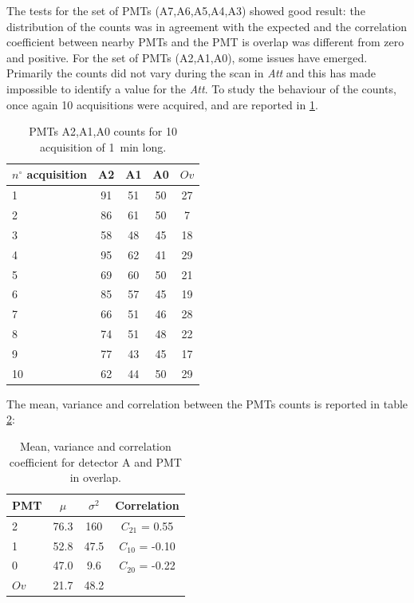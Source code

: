 The tests for the set of PMTs (A7,A6,A5,A4,A3) showed good result: the distribution of the counts was in agreement with the expected and the correlation coefficient between nearby PMTs and the PMT is overlap was different from zero and positive.
For the set of PMTs (A2,A1,A0), some issues have emerged. Primarily the counts did not vary during the scan in \textit{Att} and this has made impossible to identify a value for the \textit{Att}. To study the behaviour of the counts, once again 10 acquisitions were acquired, and are reported in \ref{tab:PmtAproblem}.

\begin{table}[!htb]
\centering
\begin{tabular}{lcccc}
\hline 
$n^{\circ}$ acquisition & A2 & A1 & A0 & $Ov$ \\ 
\hline 
1 & 91 & 51 & 50 & 27 \\ 
 
2 & 86 & 61 & 50 & 7 \\ 
 
3 & 58 & 48 & 45 & 18 \\ 
 
4 & 95 & 62 & 41 & 29 \\ 
 
5 & 69 & 60 & 50 & 21 \\ 
 
6 & 85 & 57 & 45 & 19 \\ 
 
7 & 66 & 51 & 46 & 28 \\ 
 
8 & 74 & 51 & 48 & 22 \\ 
 
9 & 77 & 43 & 45 & 17 \\ 
 
10 & 62 & 44 & 50 & 29 \\ 
\hline 
\end{tabular}
\caption{PMTs A2,A1,A0 counts for 10 acquisition of \SI{1}{\minute} long.}
\label{tab:PmtAproblem}
\end{table}

The mean, variance and correlation between the PMTs counts is reported in table \ref{tab:ResultAA}:

\begin{table}[!ht]
\centering
\begin{tabular}{lccc}
\hline 
PMT & $\mu$ & $\sigma^{2}$ & Correlation \\
\hline
2 	& 76.3	& 160	& $C_{21}$ = 0.55 \\
1 	& 52.8	& 47.5	& $C_{10}$ = -0.10 \\
0	& 47.0	& 9.6   & $C_{20}$ = -0.22 \\
\hline
$Ov$ & 21.7 & 48.2 & \\
\hline
\end{tabular}
\caption{Mean, variance and correlation coefficient for detector A and PMT in overlap.}
\label{tab:ResultAA}
\end{table}


